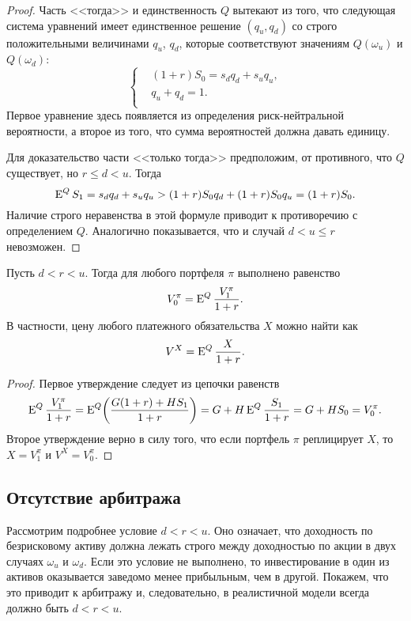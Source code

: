\begin{proof}
Часть <<тогда>> и единственность $Q$ вытекают из того, что следующая система уравнений имеет единственное решение $(q_u,q_d)$ со строго положительными величинами $q_u$, $q_d$, которые соответствуют значениям $Q(\omega_u)$ и $Q(\omega_d)$:
\[
\left\{
\begin{aligned}
&(1+r)S_0 = s_dq_d + s_uq_u,\\
&q_u + q_d = 1.\\
\end{aligned}
\right.
\]
Первое уравнение здесь появляется из определения риск-нейтральной вероятности, а второе из того, что сумма вероятностей должна давать единицу.

Для доказательство части <<только тогда>> предположим, от противного, что $Q$ существует, но $r\le d < u$. Тогда
\[
\operatorname{E}^Q S_1 = s_d q_d + s_uq_u > (1+r)S_0 q_d + (1+r)S_0 q_u = (1+r)S_0.
\]
Наличие строго неравенства в этой формуле приводит к противоречию с определением $Q$.
Аналогично показывается, что и случай $d<u\le r$ невозможен.
\end{proof}

\begin{proposition}
Пусть $d < r< u$. Тогда для любого портфеля $\pi$ выполнено равенство
\[
V_0^\pi = \operatorname{E}^Q \frac{V_1^\pi}{1+r}.
\]
В частности, цену любого платежного обязательства $X$ можно найти как
\begin{equation}
\label{os:risk-neutal-price}
V^X = \operatorname{E}^Q \frac{X}{1+r}.
\end{equation}
\end{proposition}

\begin{proof}
Первое утверждение следует из цепочки равенств  
\[
\operatorname{E}^Q \frac{V_1^\pi}{1+r} = \operatorname{E}^Q \biggl(\frac{G(1+r) + HS_1}{1+r}\biggr) 
= G + H\operatorname{E}^Q\frac{S_1}{1+r} = G + HS_0 = V_0^\pi.
\]
Второе утверждение верно в силу того, что если портфель $\pi$ реплицирует $X$, то $X = V_1^\pi$ и $V^X = V_0^\pi$.
\end{proof}


\subsection{Отсутствие арбитража}

Рассмотрим подробнее условие $d<r<u$.
Оно означает, что доходность по безрисковому активу должна лежать строго между доходностью по акции в двух случаях $\omega_u$ и $\omega_d$.
Если это условие не выполнено, то инвестирование в один из активов оказывается заведомо менее прибыльным, чем в другой.
Покажем, что это приводит к арбитражу и, следовательно, в реалистичной модели всегда должно быть $d<r<u$.

